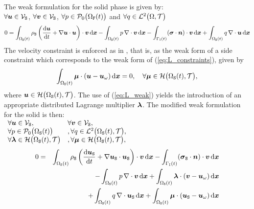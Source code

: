 \documentclass[10pt,a4paper]{article}
\begin{document}
The weak formulation for the solid phase is given by:\\
$\forall \vu \in \sVs$, $\forall \vv \in \sVs$, $\forall p \in \sP_0\big(\domf(t)\big)$ and $\forall q \in \sL^2\big(\dom, \sT\big)$
$$
0 = 
\int_{\doms(t)}\rhos\left(\dt \vu + \grad \vu \cdot \vu\right)\cdot\vv \,\d\vx 
- \int_{\doms(t)} p\,\div \vv \,\d\vx
- \int_{\boui(t)} (\vsigma\cdot\vec n) \cdot\vv \,\d\vx
+ \int_{\doms(t)} q\,\div \vu \,\d\vx
$$
The velocity constraint is enforced as in \cite{glowinski1999distributed}, that is, as the weak form of a side constraint which corresponds to the weak form of (\ref{eq:L_constraints}), given by \cite{patankar2000new}
\begin{equation}
\label{eq:L_weak}
\int_{\doms(t)} \vmu \cdot (\vu-\vuo)\,\d \vx = 0, \quad \forall\vmu \in \sH\big(\doms(t),\sT\big),
\end{equation}
where $\vu \in \sH\big(\doms(t),\sT\big)$. The use of (\ref{eq:L_weak}) yields the introduction of an appropriate distributed Lagrange multiplier $\vlambda$. The modified weak formulation for the solid is then: \\
$
\begin{array}{ll}
\forall \vu \in \sVs, & \forall \vv \in \sVs, \\
\forall p \in \sP_0\big(\doms(t)\big) &,  \forall q \in \sL^2\big(\doms(t), \sT\big), \\
\forall \vlambda \in \sH\big(\doms(t),\sT\big)&,  \forall \vmu \in \sH\big(\doms(t),\sT\big), \\
\end{array}
$
\begin{eqnarray}
\nonumber 0 &=& 
\int_{\doms(t)}\rhos\left(\dt \vus + \grad \vus \cdot \vus\right)\cdot\vv \,\d\vx 
- \int_{\boui(t)} (\vsigmas\cdot\vec n) \cdot\vv \,\d\vx \\
\nonumber & & - \int_{\doms(t)} p\,\div \vv \,\d\vx + \int_{\doms(t)} \vlambda \cdot (\vv-\vuo) \, \d \vx \\
\label{eq:solid_weak} & & + \int_{\doms(t)} q\,\div \vus \,\d\vx + \int_{\doms(t)}\vmu \cdot (\vus-\vuo)\,\d \vx
\end{eqnarray}
\end{document}
